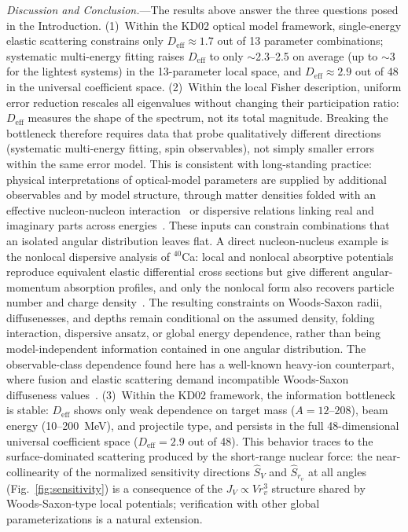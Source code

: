 \documentclass[aps,prl,reprint,superscriptaddress,showpacs,floatfix]{revtex4-2}
\begin{document}
\textit{Discussion and Conclusion.}---The results above answer the three questions posed in the Introduction. (1)~Within the KD02 optical model framework, single-energy elastic scattering constrains only $D_\mathrm{eff} \approx 1.7$ out of 13 parameter combinations; systematic multi-energy fitting raises $D_\mathrm{eff}$ to only $\sim$2.3--2.5 on average (up to $\sim$3 for the lightest systems) in the 13-parameter local space, and $D_\mathrm{eff} \approx 2.9$ out of 48 in the universal coefficient space. (2)~Within the local Fisher description, uniform error reduction rescales all eigenvalues without changing their participation ratio: $D_\mathrm{eff}$ measures the shape of the spectrum, not its total magnitude. Breaking the bottleneck therefore requires data that probe qualitatively different directions (systematic multi-energy fitting, spin observables), not simply smaller errors within the same error model. This is consistent with long-standing practice: physical interpretations of optical-model parameters are supplied by additional observables and by model structure, through matter densities folded with an effective nucleon-nucleon interaction~\cite{Greenlees1968} or dispersive relations linking real and imaginary parts across energies~\cite{Mahaux1991}. These inputs can constrain combinations that an isolated angular distribution leaves flat. A direct nucleon-nucleus example is the nonlocal dispersive analysis of $^{40}$Ca: local and nonlocal absorptive potentials reproduce equivalent elastic differential cross sections but give different angular-momentum absorption profiles, and only the nonlocal form also recovers particle number and charge density~\cite{Mahzoon2014}. The resulting constraints on Woods-Saxon radii, diffusenesses, and depths remain conditional on the assumed density, folding interaction, dispersive ansatz, or global energy dependence, rather than being model-independent information contained in one angular distribution. The observable-class dependence found here has a well-known heavy-ion counterpart, where fusion and elastic scattering demand incompatible Woods-Saxon diffuseness values~\cite{Newton2004}. (3)~Within the KD02 framework, the information bottleneck is stable: $D_\mathrm{eff}$ shows only weak dependence on target mass ($A = 12$--$208$), beam energy (10--200~MeV), and projectile type, and persists in the full 48-dimensional universal coefficient space ($D_\mathrm{eff} = 2.9$ out of 48). This behavior traces to the surface-dominated scattering produced by the short-range nuclear force: the near-collinearity of the normalized sensitivity directions $\hat{S}_V$ and $\hat{S}_{r_v}$ at all angles (Fig.~\ref{fig:sensitivity}) is a consequence of the $J_V \propto V r_v^3$ structure shared by Woods-Saxon-type local potentials; verification with other global parameterizations is a natural extension.
\end{document}
